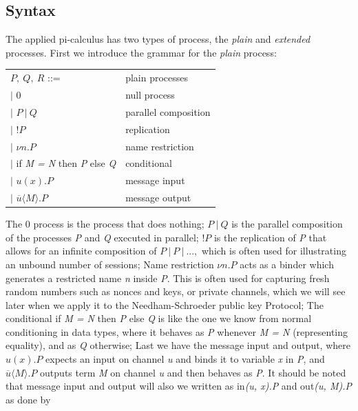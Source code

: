 \subsection{Syntax}
The applied pi-calculus has two types of process, the \textit{plain} and \textit{extended} processes. First we introduce the grammar for the \textit{plain} process:  %
\begin{center}
	\begin{tabular} { l l }
 		$P,\ Q,\ R$ ::= & plain processes \\ 
 		\quad $|$ 0 & null process \\  
 		\quad $|$ $P\ |\ Q$ & parallel composition \\
 		\quad $|$ !$P$ & replication \\
		\quad $|$ $\nu n.P$ & name restriction \\
		\quad $|$ if \textit{M = N} then \textit{P} else \textit{Q} & conditional \\
		\quad $|$ $u(x).P$ & message input \\
		\quad $|$ $\overline{u}\langle M\rangle .P $ & message output 
	\end{tabular}
\end{center}
The 0 process is the process that does nothing; $P\ |\ Q$ is the parallel composition of the processes \textit{P} and \textit{Q} executed in parallel; !$P$ is the replication of \textit{P} that allows for an infinite composition of $P\ |\ P\ |\ ...,$ which is often used for illustrating an unbound number of sessions; Name restriction $\nu n.P$ acts as a binder which generates a restricted name \textit{n} inside \textit{P}. This is often used for capturing fresh random numbers such as nonces and keys, or private channels, which we will see later when we apply it to the Needham-Schroeder public key Protocol; The conditional if \textit{M = N} then \textit{P} else \textit{Q} is like the one we know from normal conditioning in data types, where it behaves as \textit{P} whenever \textit{M = N} (representing equality), and as \textit{Q} otherwise; Last we have the message input and output, where $u(x).P$ expects an input on channel \textit{u} and binds it to variable \textit{x} in \textit{P}, and $\overline{u}\langle M\rangle .P $ outputs term \textit{M} on channel \textit{u} and then behaves as \textit{P}. It should be noted that message input and output will also we written as in\textit{(u, x).P} and out\textit{(u, M).P} as done by \citeauthor{DBLP:journals/ftpl/CortierK14} \\

